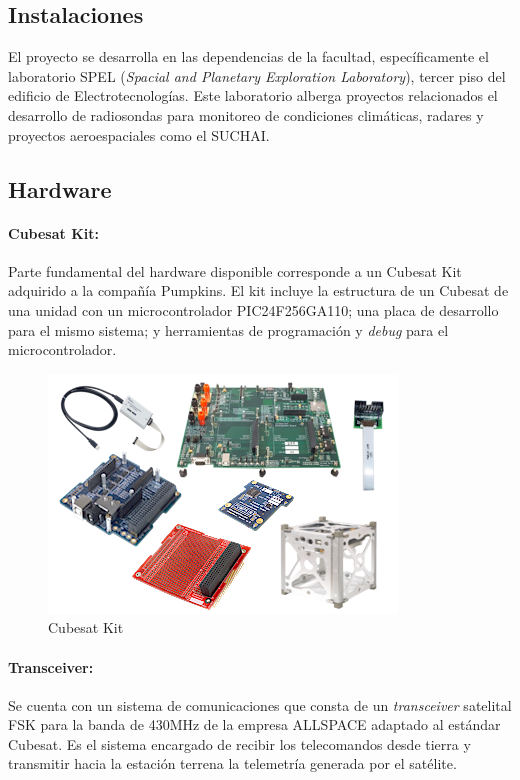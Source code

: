\documentclass[11pt,letterpaper]{article}
\begin{document}
\subsection{Instalaciones}
El proyecto se desarrolla en las dependencias de la facultad, específicamente el laboratorio SPEL (\textit{Spacial and Planetary Exploration Laboratory}), tercer piso del edificio de Electrotecnologías. Este laboratorio alberga proyectos relacionados el desarrollo de radiosondas para monitoreo de condiciones climáticas, radares y proyectos aeroespaciales como el SUCHAI.

\subsection{Hardware}
\paragraph{Cubesat Kit:}
Parte fundamental del hardware disponible corresponde a un Cubesat Kit adquirido a la compañía Pumpkins. El kit incluye la estructura de un Cubesat de una unidad con un microcontrolador PIC24F256GA110; una placa de desarrollo para el mismo sistema; y herramientas de programación y \textit{debug} para el microcontrolador.

\begin{figure}[!h] 
\centering \includegraphics[scale=0.8]{img/cubesatkit.jpg}
\caption{Cubesat Kit} \label{cubesatkit}
\end{figure}

\paragraph{Transceiver:}
Se cuenta con un sistema de comunicaciones que consta de un \textit{transceiver} satelital FSK para la banda de 430MHz de la empresa ALLSPACE adaptado al estándar Cubesat. Es el sistema encargado de recibir los telecomandos desde tierra y transmitir hacia la estación terrena la telemetría generada por el satélite.\\
\end{document}
